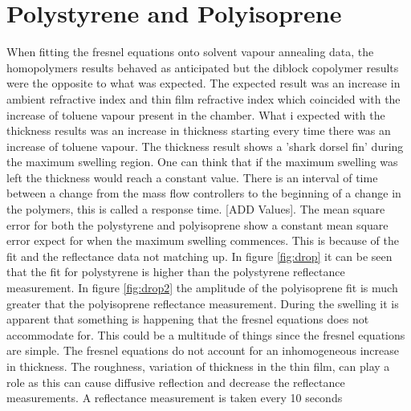 \documentclass[MasterThesisMain.tex]{subfiles}
\begin{document}
\section{Polystyrene and Polyisoprene}
When fitting the fresnel equations onto solvent vapour annealing data, the homopolymers results behaved as anticipated but the diblock copolymer results were the opposite to what was expected. The expected result was an increase in ambient refractive index and thin film refractive index which coincided with the increase of toluene vapour present in the chamber. What i expected with the thickness results was an increase in thickness starting every time there was an increase of toluene vapour. The thickness result shows a 'shark dorsel fin' during the maximum swelling region. One can think that if the maximum swelling was left the thickness would reach a constant value. There is an interval of time between a change from the mass flow controllers to the beginning of a change in the polymers, this is called a response time. [ADD Values]. The mean square error for both the polystyrene and polyisoprene show a constant mean square error expect for when the maximum swelling commences. This is because of the fit and the reflectance data not matching up. In figure \ref{fig:drop} it can be seen that the fit for polystyrene is higher than the polystyrene reflectance measurement. In figure \ref{fig:drop2} the amplitude of the polyisoprene fit is much greater that the polyisoprene reflectance measurement. During the swelling it is apparent that something is happening that the fresnel equations does not accommodate for. This could be a multitude of things since the fresnel equations are simple. The fresnel equations do not account for an inhomogeneous increase in thickness. The roughness, variation of thickness in the thin film, can play a role as this can cause diffusive reflection and decrease the reflectance measurements. A reflectance measurement is taken every 10 seconds   
\end{document}
